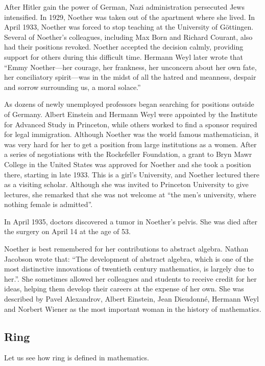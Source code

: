 \documentclass{article}
\begin{document}
After Hitler gain the power of German, Nazi administration persecuted Jews intensified. In 1929, Noether was taken out of the apartment where she lived. In April 1933, Noether was forced to stop teaching at the University of Göttingen. Several of Noether's colleagues, including Max Born and Richard Courant, also had their positions revoked. Noether accepted the decision calmly, providing support for others during this difficult time. Hermann Weyl later wrote that ``Emmy Noether—her courage, her frankness, her unconcern about her own fate, her conciliatory spirit—was in the midst of all the hatred and meanness, despair and sorrow surrounding us, a moral solace.''

As dozens of newly unemployed professors began searching for positions outside of Germany. Albert Einstein and Hermann Weyl were appointed by the Institute for Advanced Study in Princeton, while others worked to find a sponsor required for legal immigration. Although Noether was the world famous mathematician, it was very hard for her to get a position from large institutions as a women. After a series of negotiations with the Rockefeller Foundation, a grant to Bryn Mawr College in the United States was approved for Noether and she took a position there, starting in late 1933. This is a girl's University, and Noether lectured there as a visiting scholar. Although she was invited to Princeton University to give lectures, she remarked that she was not welcome at ``the men's university, where nothing female is admitted''.

In April 1935, doctors discovered a tumor in Noether's pelvis. She was died after the surgery on April 14 at the age of 53.

Noether is best remembered for her contributions to abstract algebra. Nathan Jacobson wrote that: ``The development of abstract algebra, which is one of the most distinctive innovations of twentieth century mathematics, is largely due to her.''. She sometimes allowed her colleagues and students to receive credit for her ideas, helping them develop their careers at the expense of her own. She was described by Pavel Alexandrov, Albert Einstein, Jean Dieudonné, Hermann Weyl and Norbert Wiener as the most important woman in the history of mathematics\cite{Wiki-Noether}.

\subsection{Ring}
Let us see how ring is defined in mathematics.
\end{document}

